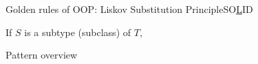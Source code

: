 \begin{frame}{Golden rules of OOP: Liskov Substitution Principle}{SO\underline  LID}
	\begin{center}
		If $S$ is a subtype (subclass) of $T$, 
	\end{center}
\end{frame}

\begin{frame}{Pattern overview}
	
\end{frame}